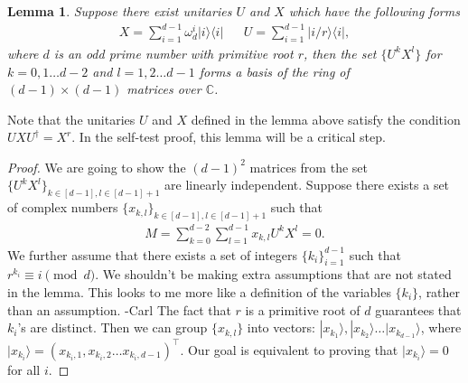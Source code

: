 \documentclass[11pt,letterpaper]{article}
\newcommand{\ket}[1]{|#1\rangle}
\newcommand{\ketbra}[2]{|#1\rangle\langle#2|}
\newcommand{\C}{\mathbb{C}}
\newcommand{\1}{\mathbb{1}}
\def\carl#1{{\color{blue} #1 -Carl}}
\newtheorem{lemma}[theorem]{Lemma}
\theoremstyle{definition}
\begin{document}
\begin{lemma}
	\label{lm:ux_independ}
	Suppose there exist unitaries $U$ and $X$ which have the following forms
	\begin{align}
		X = \sum_{i=1}^{d-1} \omega_d^i \ketbra{i}{i} && U = \sum_{i=1}^{d-1}\ketbra{i/r}{i},
	\end{align}
	where $d$ is an odd prime number with primitive root $r$,
	then the set $\{U^k X^l\}$ for $k=0,1\dots d-2$ and $l = 1,2\dots d-1$ forms a basis of 
	the ring of $(d-1)\times (d-1)$ matrices over $\C$.
\end{lemma}
Note that the unitaries $U$ and $X$ defined in the lemma above satisfy the condition $UXU^\dagger = X^r$.
In the self-test proof, this lemma will be a critical step.
\begin{proof}
We are going to show the $(d-1)^2$ matrices from the set $\{U^k X^l\}_{k \in[d-1], l \in [d-1]+1}$ are linearly independent.
Suppose there exists a set of complex numbers $\{ x_{k,l} \}_{k \in[d-1], l \in [d-1]+1}$
such that 
\begin{align}
	M = \sum_{k=0}^{d-2} \sum_{l=1}^{d-1} x_{k,l} U^k X^l = 0. 
\end{align}
We further assume that there exists a set of integers $\{ k_i \}_{i=1}^{d-1}$ such that $r^{k_i} \equiv i \pmod{d}$.
\carl{We shouldn't be making extra assumptions that are not stated in the lemma.  This looks to me more like
a definition of the variables $\{ k_i \}$, rather than an assumption.}
The fact that $r$ is a primitive root of $d$ guarantees that $k_i$'s are distinct.
Then we can group $\{x_{k,l}\}$ into vectors: $\ket{x_{k_1}}, \ket{x_{k_2}} \dots \ket{x_{k_{d-1}}}$,
where $\ket{x_{k_i}}= (x_{k_i, 1}, x_{k_i, 2} \dots x_{k_i, d-1})^\intercal$.
Our goal is equivalent to proving that $\ket{x_{k_i}} = 0$ for all $i$.


\end{proof}
\end{document}
